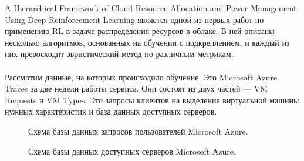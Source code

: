 \documentclass{article}
\begin{document}
A Hierarchical Framework of Cloud Resource Allocation and Power Management Using Deep Reinforcement Learning\cite{litlink24} является одной из первых работ по применению RL в задаче распределения ресурсов в облаке. В ней описаны несколько алгоритмов, основанных на обучении с подкреплением, и каждый из них превосходит эвристический метод по различным метрикам.\\~\\
Рассмотим данные, на которых происходило обучение. Это Microsoft Azure Traces за две недели работы сервиса. Они состоят из двух частей — VM Requests и VM Types. Это запросы клиентов на выделение виртуальной машины нужных характеристик и база данных доступных серверов. 
\begin{figure}[h]
\caption{Схема базы данных запросов пользователей Microsoft Azure\cite{litlink22}.}
\label{ris:image}
\end{figure}
\begin{figure}[h]
\caption{Схема базы данных доступных серверов Microsoft Azure\cite{litlink22}.}
\label{ris:image}
\end{figure}
\end{document}
